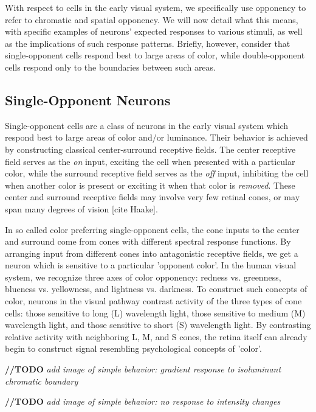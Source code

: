 \documentclass[journal,onecolumn]{IEEEtran}
\begin{document}
With respect to cells in the early visual system, we specifically use opponency to refer to chromatic and spatial opponency. We will now detail what this means, with specific examples of neurons' expected responses to various stimuli, as well as the implications of such response patterns. Briefly, however, consider that single-opponent cells respond best to large areas of color, while double-opponent cells respond only to the boundaries between such areas.


\subsection*{Single-Opponent Neurons}

Single-opponent cells are a class of neurons in the early visual system which respond best to large areas of color and/or luminance. Their behavior is achieved by constructing classical center-surround receptive fields. The center receptive field serves as the \textit{on} input, exciting the cell when presented with a particular color, while the surround receptive field serves as the \textit{off} input, inhibiting the cell when another color is present or exciting it when that color is \textit{removed}. These center and surround receptive fields may involve very few retinal cones, or may span many degrees of vision [cite Haake].

In so called color preferring single-opponent cells, the cone inputs to the center and surround come from cones with different spectral response functions. By arranging input from different cones into antagonistic  receptive fields, we get a neuron which is sensitive to a particular 'opponent color'. In the human visual system, we recognize three axes of color opponency: redness vs. greenness, blueness vs. yellowness, and lightness vs. darkness. To construct such concepts of color, neurons in the visual pathway contrast activity of the three types of cone cells: those sensitive to long (L) wavelength light, those sensitive to medium (M) wavelength light, and those sensitive to short (S) wavelength light. By contrasting relative activity with neighboring L, M, and S cones, the retina itself can already begin to construct signal resembling psychological concepts of 'color'.

\bigskip

\textbf{//TODO} \textit{add image of simple behavior: gradient response to isoluminant chromatic boundary}

\textbf{//TODO} \textit{add image of simple behavior: no response to intensity changes}
\end{document}
